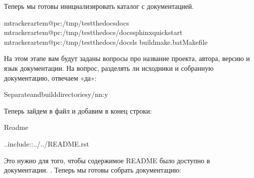 \documentclass[letterpaper,10pt,russian]{sphinxmanual}
\begin{document}
\sphinxAtStartPar
Теперь мы готовы инициализировать каталог с документацией.

\begin{sphinxVerbatim}[commandchars=\\\{\}]
mtrackerartem@pc:\PYGZti{}/tmp/test\PYGZus{}the\PYGZus{}docs\PYGZdl{}docs
mtrackerartem@pc:\PYGZti{}/tmp/test\PYGZus{}the\PYGZus{}docs/docs\PYGZdl{}sphinx\PYGZhy{}quickstart
mtrackerartem@pc:\PYGZti{}/tmp/test\PYGZus{}the\PYGZus{}docs/docs\PYGZdl{}ls
buildmake.batMakefile
\end{sphinxVerbatim}

\sphinxAtStartPar
На этом этапе вам будут заданы вопросы про название проекта, автора, версию и язык документации. На вопрос, разделять ли исходники и собранную документацию, отвечаем «да»:

\begin{sphinxVerbatim}[commandchars=\\\{\}]
\PYGZgt{}Separateandbuilddirectoriesy/n\PYG{o}{[}n\PYG{o}{]}:y
\end{sphinxVerbatim}

\sphinxAtStartPar
Теперь зайдем в файл  и добавим в конец строки:

\begin{sphinxVerbatim}[commandchars=\\\{\}]
Readme

..include::../../README.rst
\end{sphinxVerbatim}

\sphinxAtStartPar
Это нужно для того, чтобы содержимое README было доступно в документации. . Теперь мы готовы собрать документацию:
\end{document}
